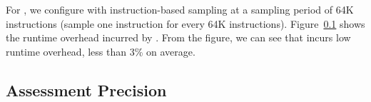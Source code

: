 For \cheetah{}, we configure with instruction-based sampling at a sampling period of 64K instructions (sample one instruction for every 64K instructions). Figure~\ref{} shows the runtime overhead incurred by \cheetah{}. From the figure, we can see that \cheetah{} incurs low runtime overhead, less than 3\% on average.

\subsection{Assessment Precision}



